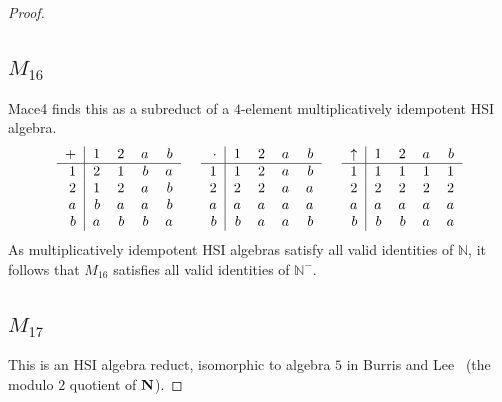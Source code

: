 \documentclass[eqnor,reqno]{amsart}
\theoremstyle{plain}
\theoremstyle{definition}
\begin{document}
\begin{proof}
\subsection{$M_{16}$} Mace4 finds this as a subreduct of a $4$-element multiplicatively idempotent HSI algebra.  
\[
\begin{tabular}{r|rrrr}
$+$ & $1$ & $2$ & $a$ & $b$\\
\hline
    $1$ & $2$ & $1$ & $b$ & $a$ \\
    $2$ & $1$ & $2$ & $a$ & $b$ \\
    $a$ & $b$ & $a$ & $a$ & $b$ \\
    $b$ & $a$ & $b$ & $b$ & $a$
\end{tabular} \hspace{.5cm}
\begin{tabular}{r|rrrr}
$\cdot$ & $1$ & $2$ & $a$ & $b$\\
\hline
    $1$ & $1$ & $2$ & $a$ & $b$ \\
    $2$ & $2$ & $2$ & $a$ & $a$ \\
    $a$ & $a$ & $a$ & $a$ & $a$ \\
    $b$ & $b$ & $a$ & $a$ & $b$
\end{tabular} \hspace{.5cm}
\begin{tabular}{r|rrrr}
$\uparrow$ & $1$ & $2$ & $a$ & $b$\\
\hline
    $1$ & $1$ & $1$ & $1$ & $1$ \\
    $2$ & $2$ & $2$ & $2$ & $2$ \\
    $a$ & $a$ & $a$ & $a$ & $a$ \\
    $b$ & $b$ & $b$ & $a$ & $a$
\end{tabular}
\]
As multiplicatively idempotent HSI algebras satisfy all valid identities of $\mathbb{N}$, it follows that $M_{16}$ satisfies all valid identities of $\mathbb{N}^-$.

\subsection{$M_{17}$} This is an HSI algebra reduct, isomorphic to algebra $5$ in Burris and Lee~\cite[Theorem~4.1]{burlee92} (the modulo $2$ quotient of ${\bf N}$).


\end{proof}
\end{document}
